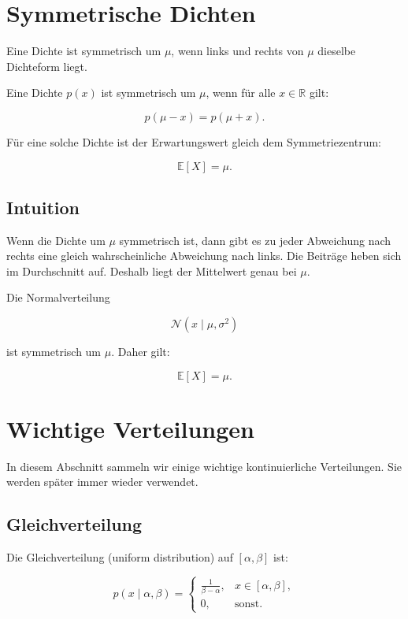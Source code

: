 \section{Symmetrische Dichten}

Eine Dichte ist symmetrisch um \(\mu\), wenn links und rechts von \(\mu\) dieselbe Dichteform liegt.

\begin{definitionbox}
Eine Dichte \(p(x)\) ist symmetrisch um \(\mu\), wenn für alle \(x \in \mathbb{R}\) gilt:

\[
    p(\mu - x)
    =
    p(\mu + x).
\]
\end{definitionbox}

Für eine solche Dichte ist der Erwartungswert gleich dem Symmetriezentrum:

\[
    \mathbb{E}[X] = \mu.
\]

\subsection{Intuition}

Wenn die Dichte um \(\mu\) symmetrisch ist, dann gibt es zu jeder Abweichung nach rechts eine gleich wahrscheinliche Abweichung nach links.
Die Beiträge heben sich im Durchschnitt auf.
Deshalb liegt der Mittelwert genau bei \(\mu\).

\begin{examplebox}
Die Normalverteilung

\[
    \mathcal{N}(x \mid \mu,\sigma^2)
\]

ist symmetrisch um \(\mu\).
Daher gilt:

\[
    \mathbb{E}[X] = \mu.
\]
\end{examplebox}

\section{Wichtige Verteilungen}

In diesem Abschnitt sammeln wir einige wichtige kontinuierliche Verteilungen.
Sie werden später immer wieder verwendet.

\subsection{Gleichverteilung}

Die Gleichverteilung (uniform distribution) auf \([\alpha,\beta]\) ist:

\[
    p(x \mid \alpha,\beta)
    =
    \begin{cases}
        \frac{1}{\beta-\alpha}, & x \in [\alpha,\beta], \\
        0, & \text{sonst}.
    \end{cases}
\]

